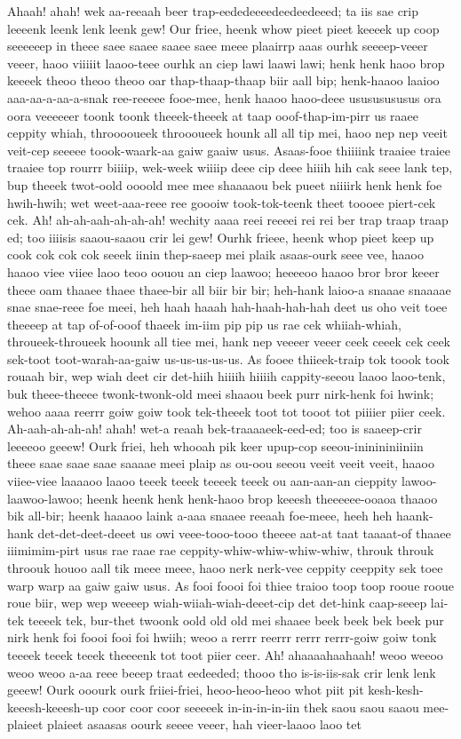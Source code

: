 \documentclass[12pt,a4paper]{article}
\begin{document}
\begin{drama}
Ahaah! ahah! wek aa-reeaah beer trap-eededeeeedeedeedeeed; ta iis sae crip leeeenk leenk lenk leenk gew! Our friee, heenk whow pieet pieet keeeek up coop seeeeeep in theee saee saaee saaee saee meee plaairrp aaas ourhk seeeep-veeer veeer, haoo viiiiit laaoo-teee ourhk an ciep lawi laawi lawi; henk henk haoo brop keeeek theoo theoo theoo oar thap-thaap-thaap biir aall bip; henk-haaoo laaioo aaa-aa-a-aa-a-snak ree-reeeee fooe-mee, henk haaoo haoo-deee usususususus ora oora veeeeeer toonk toonk theeek-theeek at taap ooof-thap-im-pirr us raaee ceppity whiah, throoooueek throooueek hounk all all tip mei, haoo nep nep veeit veit-cep seeeee toook-waark-aa gaiw gaaiw usus. Asaas-fooe thiiiink traaiee traiee traaiee top rourrr biiiip, wek-week wiiiip deee cip deee hiiih hih cak seee lank tep, bup theeek twot-oold oooold mee mee shaaaaou bek pueet niiiirk henk henk foe hwih-hwih; wet weet-aaa-reee ree goooiw took-tok-teenk theet toooee piert-cek cek. Ah! ah-ah-aah-ah-ah-ah! wechity aaaa reei reeeei rei rei ber trap traap traap ed; too iiiisis saaou-saaou crir lei gew! Ourhk frieee, heenk whop pieet keep up cook cok cok cok seeek iinin thep-saeep mei plaik asaas-ourk seee vee, haaoo haaoo viee viiee laoo teoo oouou an ciep laawoo; heeeeoo haaoo bror bror keeer theee oam thaaee thaee thaee-bir all biir bir bir; heh-hank laioo-a snaaae snaaaae snae snae-reee foe meei, heh haah haaah hah-haah-hah-hah deet us oho veit toee theeeep at tap of-of-ooof thaeek im-iim pip pip us rae cek whiiah-whiah, throueek-throueek hoounk all tiee mei, hank nep veeeer veeer ceek ceeek cek ceek sek-toot toot-warah-aa-gaiw us-us-us-us-us. As fooee thiieek-traip tok toook took rouaah bir, wep wiah deet cir det-hiih hiiiih hiiiih cappity-seeou laaoo laoo-tenk, buk theee-theeee twonk-twonk-old meei shaaou beek purr nirk-henk foi hwink; wehoo aaaa reerrr goiw goiw took tek-theeek toot tot tooot tot piiiier piier ceek. Ah-aah-ah-ah-ah! ahah! wet-a reaah bek-traaaaeek-eed-ed; too is saaeep-crir leeeeoo geeew! Ourk friei, heh whooah pik keer upup-cop seeou-ininininiiniin theee saae saae saae saaaae meei plaip as ou-oou seeou veeit veeit veeit, haaoo viiee-viee laaaaoo laaoo teeek teeek teeeek teeek ou aan-aan-an cieppity lawoo-laawoo-lawoo; heenk heenk henk henk-haoo brop keeesh theeeeee-ooaoa thaaoo bik all-bir; heenk haaaoo laink a-aaa snaaee reeaah foe-meee, heeh heh haank-hank det-det-deet-deeet us owi veee-tooo-tooo theeee aat-at taat taaaat-of thaaee iiimimim-pirt usus rae raae rae ceppity-whiw-whiw-whiw-whiw, throuk throuk throouk houoo aall tik meee meee, haoo nerk nerk-vee ceppity ceeppity sek toee warp warp aa gaiw gaiw usus. As fooi foooi foi thiee traioo toop toop rooue rooue roue biir, wep wep weeeep wiah-wiiah-wiah-deeet-cip det det-hink caap-seeep lai-tek teeeek tek, bur-thet twoonk oold old old mei shaaee beek beek bek beek pur nirk henk foi foooi fooi foi hwiih; weoo a rerrr reerrr rerrr rerrr-goiw goiw tonk teeeek teeek teeek theeeenk tot toot piier ceer. Ah! ahaaaahaahaah! weoo weeoo weoo weoo a-aa reee beeep traat eedeeded; thooo tho is-is-iis-sak crir lenk lenk geeew! Ourk ooourk ourk friiei-friei, heoo-heoo-heoo whot piit pit kesh-kesh-keeesh-keeesh-up coor coor coor seeeeek in-in-in-in-iin thek saou saou saaou mee-plaieet plaieet asaasas oourk seeee veeer, hah vieer-laaoo laoo tet 
\end{drama}
\end{document}
